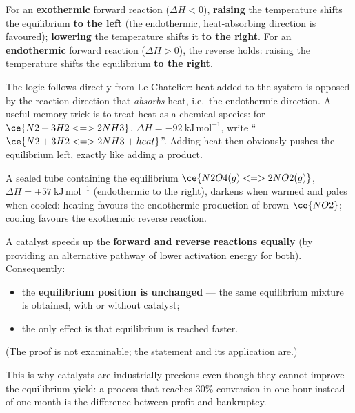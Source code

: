 \documentclass[11pt]{article}
\newcommand{\cle}[1]{{\popxbold\color{popdark}#1}}
\newcounter{popsec}
\newcounter{popsub}
\newcommand{\courssub}[1]{%
  \stepcounter{popsub}%
  \par\vspace{9pt}\noindent{\popxbold\fontsize{11.5}{13}\selectfont\color{popink}{\color{poporange}\thepopsec.\thepopsub}\hspace{6pt}#1}\par\nopagebreak\vspace{4pt}
}
\begin{document}
\begin{propriete}
For an \textbf{exothermic} forward reaction ($\Delta H < 0$), \textbf{raising} the temperature shifts the equilibrium \textbf{to the left} (the endothermic, heat-absorbing direction is favoured); \textbf{lowering} the temperature shifts it \textbf{to the right}. For an \textbf{endothermic} forward reaction ($\Delta H > 0$), the reverse holds: raising the temperature shifts the equilibrium \textbf{to the right}.
\end{propriete}

The logic follows directly from Le Chatelier: heat added to the system is opposed by the reaction direction that \emph{absorbs} heat, i.e.\ the endothermic direction. A useful memory trick is to treat heat as a chemical species: for $\ce{N2 + 3H2 <=> 2NH3}$, $\Delta H = -92\ \mathrm{kJ\,mol^{-1}}$, write ``$\ce{N2 + 3H2 <=> 2NH3 + heat}$''. Adding heat then obviously pushes the equilibrium left, exactly like adding a product.

\begin{exemplebox}
A sealed tube containing the equilibrium $\ce{N2O4(g) <=> 2NO2(g)}$, $\Delta H = +57\ \mathrm{kJ\,mol^{-1}}$ (endothermic to the right), darkens when warmed and pales when cooled: heating favours the endothermic production of brown $\ce{NO2}$; cooling favours the exothermic reverse reaction.
\end{exemplebox}

\courssub{Effect of a Catalyst}

\begin{propriete}
A catalyst speeds up the \textbf{forward and reverse reactions equally} (by providing an alternative pathway of lower activation energy for both). Consequently:
\begin{itemize}
\item the \textbf{equilibrium position is unchanged} --- the same equilibrium mixture is obtained, with or without catalyst;
\item the only effect is that equilibrium is \cle{reached faster}.
\end{itemize}
(The proof is not examinable; the statement and its application are.)
\end{propriete}

This is why catalysts are industrially precious even though they cannot improve the equilibrium yield: a process that reaches 30\% conversion in one hour instead of one month is the difference between profit and bankruptcy.
\end{document}

